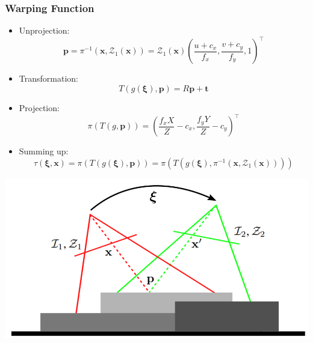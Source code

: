 \begin{frame}
\frametitle{Warping Function}

\vspace{1.5em}
\begin{multicols}{2}
    \begin{itemize}
        \item Unprojection:
        $$\mathbf{p} = \pi^{-1}\left(\mathbf{x}, \mathcal{Z}_1(\mathbf{x})\right) = \mathcal{Z}_{1}(\mathbf{x})\left(\frac{u+c_x}{f_x}, \frac{v+c_y}{f_y}, 1\right)^{\top}$$
        \vfill\item Transformation:
        $$T(g(\boldsymbol{\xi}), \mathbf{p})=R \mathbf{p}+\mathbf{t}$$
        \vfill\item Projection:
        $$\pi(T(g, \mathbf{p}))=\left(\frac{f_x X}{Z}-c_x, \frac{f_y Y}{Z}-c_y\right)^{\top}$$
        \vfill\item Summing up:
        $$\tau(\boldsymbol{\xi}, \mathbf{x}) =\pi(T(g(\boldsymbol{\xi}), \mathbf{p})) = \pi\left(T\left(g(\boldsymbol{\xi}), \pi^{-1}\left(\mathbf{x}, \mathcal{Z}_1(\mathbf{x})\right)\right)\right)$$
    \end{itemize}
    \vfill\columnbreak
    \includegraphics[width=\columnwidth]{Bilder/warping.png}%
\end{multicols}

\end{frame}
\clearpage

